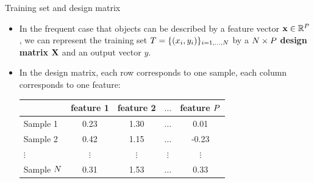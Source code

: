 \documentclass[xcolor=pdftex,dvipsnames,table]{beamer}
\begin{document}
\begin{frame}{Training set and design matrix}
\begin{itemize}
\item In the frequent case that objects can be described by a feature vector $\mathbf{x} \in \mathbb{R}^{P}$, we can represent the training set $T = \{(x_i, y_i)\}_{i=1, \ldots, N}$ by a $N \times P$ \textbf{design matrix} $\mathbf{X}$ and an output vector $y$.
\item In the design matrix, each row corresponds to one sample, each column corresponds to one feature: 
\begin{table}
\begin{tabular}{|l || c | c | c | c |}
	\hline
		& feature 1 & feature 2 & $\ldots$ & feature $P$ \\
	\hline \hline
	Sample 1 & 0.23 & 1.30 & $\ldots$ & 0.01 \\ 
	\hline
	Sample 2 & 0.42 & 1.15 & $\ldots$ & -0.23 \\ 
	\hline
	$\vdots$ & $\vdots$ & $\vdots$ & $\vdots$ & $\vdots$ \\ 
	\hline
	Sample $N$ & 0.31 & 1.53 & $\ldots$ & 0.33 \\ 
	\hline
\end{tabular}
\end{table}
\end{itemize}
\end{frame}
\end{document}
